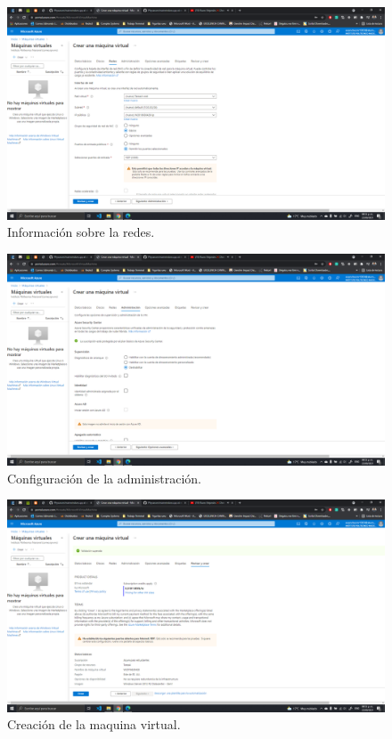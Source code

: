 \documentclass[11pt]{article}
\begin{document}
		\begin{figure}[H]
			\centering
			\includegraphics[scale=0.34]{resources/datosredes.png}
			\caption{Información sobre la redes. }\label{fig:picture}
		\end{figure}
		\begin{figure}[H]
			\centering
			\includegraphics[scale=0.34]{resources/datosadministracion.png}
			\caption{Configuración de la administración. }\label{fig:picture}
		\end{figure}
		\begin{figure}[H]
			\centering
			\includegraphics[scale=0.34]{resources/revisarycrear.png}
			\caption{Creación de la maquina virtual. }\label{fig:picture}
		\end{figure}
\end{document}

